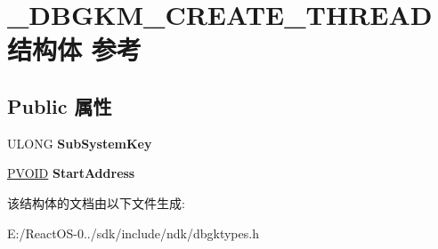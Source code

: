 \hypertarget{struct___d_b_g_k_m___c_r_e_a_t_e___t_h_r_e_a_d}{}\section{\+\_\+\+D\+B\+G\+K\+M\+\_\+\+C\+R\+E\+A\+T\+E\+\_\+\+T\+H\+R\+E\+A\+D结构体 参考}
\label{struct___d_b_g_k_m___c_r_e_a_t_e___t_h_r_e_a_d}
\subsection*{Public 属性}
\begin{DoxyCompactItemize}
\item 
\mbox{\label{struct___d_b_g_k_m___c_r_e_a_t_e___t_h_r_e_a_d_a7ae29756b4c7e2a9ba24db5c83c111da}} 
U\+L\+O\+NG {\bfseries Sub\+System\+Key}
\item 
\mbox{\label{struct___d_b_g_k_m___c_r_e_a_t_e___t_h_r_e_a_d_a462f1820fe3f37754b0f6733ab57aa98}} 
\hyperlink{interfacevoid}{P\+V\+O\+ID} {\bfseries Start\+Address}
\end{DoxyCompactItemize}


该结构体的文档由以下文件生成\+:\begin{DoxyCompactItemize}
\item 
E\+:/\+React\+O\+S-\/0../sdk/include/ndk/dbgktypes.\+h\end{DoxyCompactItemize}
